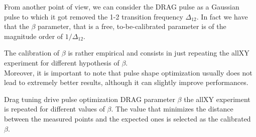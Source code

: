 From another point of view, we can consider the DRAG pulse as a Gaussian pulse to which it got removed the 1-2 transition frequency $\Delta_{12}$.
In fact we have that the $\beta$ parameter, that is a free, to-be-calibrated parameter is of the magnitude order of $1/\Delta_{12}$.

The calibration of $\beta$ is rather empirical and consists in just repeating the allXY experiment for different hypothesis of $\beta$.\\
Moreover, it is important to note that pulse shape optimization usually does not lead to extremely better results, although it can slightly improve performances.

\experimentrecap
{Drag tuning}
{drive pulse optimization}
{DRAG parameter $\beta$}
{the allXY experiment is repeated for different values of $\beta$. The value that minimizes the distance between the measured points and the expected ones is selected as the calibrated $\beta$.}



